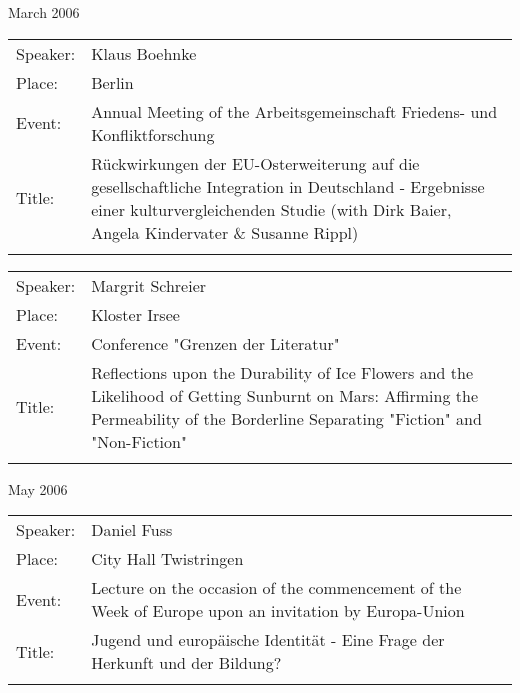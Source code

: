 {\begin{flushleft}
March 2006\\[0.5cm] 
\end{flushleft}
\begin{tabular}{lp{13.4cm}}
 Speaker:	&   Klaus Boehnke \\
 Place: 	 & Berlin\\
 Event:   &	Annual Meeting of the Arbeitsgemeinschaft Friedens- und Konfliktforschung\\
 Title: &		R\"{u}ckwirkungen der EU-Osterweiterung auf die gesellschaftliche Integration in Deutschland - Ergebnisse einer kulturvergleichenden Studie (with Dirk Baier, Angela Kindervater \& Susanne Rippl) \\ \\
\end{tabular}
\begin{tabular}{lp{13.4cm}}
 Speaker:	&   Margrit Schreier \\
 Place: 	 &Kloster Irsee\\
 Event:   &	Conference "Grenzen der Literatur"\\
 Title: &		Reflections upon the Durability of Ice Flowers and the Likelihood of Getting Sunburnt on Mars: Affirming the Permeability of the Borderline Separating "Fiction" and "Non-Fiction" \\ \\
\end{tabular}





\begin{flushleft}
May 2006\\[0.5cm] 
\end{flushleft}
\begin{tabular}{lp{13.4cm}}
 Speaker:	&   Daniel Fuss \\
 Place: 	 &City Hall Twistringen\\
 Event:   &	Lecture on the occasion of the commencement of the Week of Europe upon an invitation by Europa-Union\\
 Title: &	Jugend und europ\"{a}ische Identit\"{a}t - Eine Frage der Herkunft und der Bildung?\\ \\
\end{tabular}
	

\newpage


}
